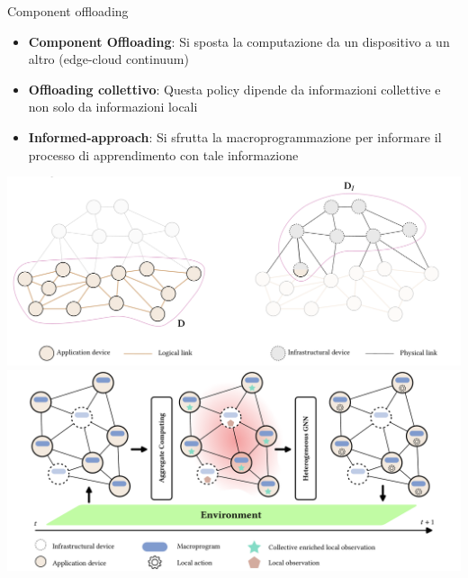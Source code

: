 \documentclass[presentation, 10pt,aspectratio=169]{beamer}\mode<presentation>{\usetheme{AMSBolognaFC}}
\begin{document}
\begin{frame}{Component offloading}
\begin{minipage}{0.4\textwidth}
	\begin{itemize}
		\item \textbf{Component Offloading}: Si sposta la computazione da un dispositivo a un altro (edge-cloud continuum)
		\item \textbf{Offloading collettivo}: Questa policy dipende da informazioni collettive e non solo da informazioni locali
		\item \textbf{Informed-approach}: Si sfrutta la macroprogrammazione per informare il processo di apprendimento con tale informazione
	\end{itemize}
\end{minipage}
\begin{minipage}{0.58\textwidth}
	\centering
	\includegraphics[width=\textwidth]{img/task-offloading.png}
	\includegraphics[width=\textwidth]{img/task-offloading-2.png}
\end{minipage}
\end{frame}
\end{document}
